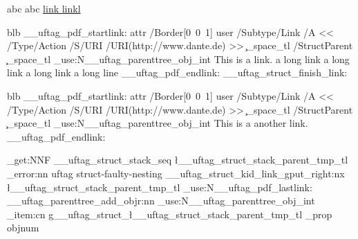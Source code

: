 \documentclass{article}
\begin{document}
\leavevmode
{}
abc
\tagmcend
{}
abc
\tagmcend
{}
\href{www.dante.de}{link linkl}
\tagmcend
\tagstructend

\ExplSyntaxOn\makeatletter

blb
\__uftag_pdf_startlink:
    attr {/Border[0~0~1]}
    user {
          /Subtype/Link%
          /A
           <<
            /Type/Action
            /S/URI
            /URI(http://www.dante.de)
           >>
         \c_space_tl
         /StructParent \c_space_tl \int_use:N\c@g__uftag_parenttree_obj_int
         }
    This is a link. a long link a long link a long link a long line
\__uftag_pdf_endlink:
\__uftag_struct_finish_link:

\ExplSyntaxOff
\tagmcend
\tagstructend

\ExplSyntaxOn\makeatletter
blb
\__uftag_pdf_startlink:
    attr {/Border[0~0~1]}
    user {
          /Subtype/Link%
          /A
           <<
            /Type/Action
            /S/URI
            /URI(http://www.dante.de)
           >>
         \c_space_tl
         /StructParent \c_space_tl \int_use:N\c@g__uftag_parenttree_obj_int
         }
    This is a another link.
\__uftag_pdf_endlink:

\seq_get:NNF
    \g__uftag_struct_stack_seq
    \l__uftag_struct_stack_parent_tmp_tl
    {
     \msg_error:nn { uftag } { struct-faulty-nesting }
    }
\__uftag_struct_kid_link_gput_right:nx
 {
  \l__uftag_struct_stack_parent_tmp_tl
 }
 {
  \int_use:N\__uftag_pdf_lastlink:
 }
 \__uftag_parenttree_add_objr:nn
 {
  \int_use:N\c@g__uftag_parenttree_obj_int
 }
 {
  \prop_item:cn{ g__uftag_struct_\l__uftag_struct_stack_parent_tmp_tl _prop }
  { objnum }
 }

\ExplSyntaxOff
\tagmcend
\tagstructend
\tagstructend
\tagstructend
\end{document}
